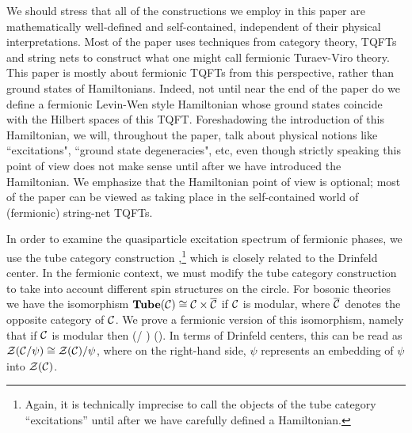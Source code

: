 We should stress that all of the constructions we employ in this paper are mathematically well-defined and 
self-contained, independent of their physical interpretations. 
Most of the paper uses techniques from category theory, TQFTs and string nets to construct what one
might call fermionic Turaev-Viro theory.
This paper is mostly about fermionic TQFTs from this perspective, 
rather than ground states of Hamiltonians. 
Indeed, not until near the end of the paper do we define a fermionic Levin-Wen style Hamiltonian whose ground states coincide with 
the Hilbert spaces of this TQFT.
Foreshadowing the introduction of this Hamiltonian, we will, throughout the paper, talk about physical notions like ``excitations", ``ground state degeneracies", 
etc, even though
strictly speaking this point of view does not make sense until after we have introduced the Hamiltonian.
We emphasize that the Hamiltonian point of view is optional; most of the paper can be viewed as taking place
in the self-contained world of (fermionic) string-net TQFTs.

In order to examine the quasiparticle excitation spectrum of fermionic phases, 
we use the tube category construction \cite{ocneanu1994},\footnote{
Again, it is technically imprecise to call the objects of the tube category ``excitations'' until after we have carefully defined a Hamiltonian.}
which is closely related to the Drinfeld center.
In the fermionic context, we must modify the tube category construction to take into account different spin structures on the circle.
For bosonic theories we have the isomorphism $\textbf{Tube}(\mathcal{C})\cong\mathcal{C}\times\overline{\mathcal{C}}$ \cite{muger2003b} if $\mathcal{C}$ is modular, where $\overline{\mathcal{C}}$ denotes the opposite category of $\mathcal{C}$.
We prove a fermionic version of this isomorphism, namely that 
if $\mathcal{C}$ is modular then 
\be 
	\tube(\mcc / \psi) \cong \mcc \times (\overline{\mcc / \psi}).
\ee
In terms of Drinfeld centers, this can be read as $\mathcal{Z}(\mathcal{C} / \psi)\cong \mathcal{Z}(\mathcal{C})/\psi$, where on the right-hand side, 
$\psi$ represents an embedding of $\psi$ into $\mathcal{Z}(\mathcal{C})$.

